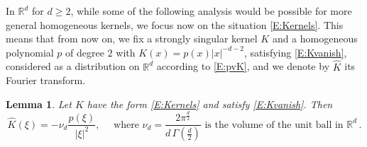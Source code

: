 \documentclass[12pt]{amsart}
\newtheorem{lemma}[theorem]{Lemma}
\theoremstyle{definition}
\theoremstyle{remark}
\numberwithin{equation}{section}
\newcommand\R{{\mathbb R}}
\let\hat=\widehat
\begin{document}
In $\R^{d}$ for $d\ge2$, while some of the following analysis would be possible for more general homogeneous kernels, we focus now on the situation \eqref{E:Kernels}. 
This means that from now on, we fix a strongly singular kernel $K$ and a homogeneous polynomial $p$ of degree $2$ with $K(x)=p(x)|x|^{-d-2}$, satisfying \eqref{E:Kvanish}, considered as a distribution on $\R^{d}$ according to \eqref{E:pvK}, and we denote by $\hat K$ its Fourier transform. 
\begin{lemma}
 \label{L:Khat} 
 Let $K$ have the form \eqref{E:Kernels} and satisfy \eqref{E:Kvanish}. Then
 \begin{equation}
\label{E:FKhat}
   \hat K(\xi) = -\nu_{d} \frac{p(\xi)}{|\xi|^{2}}, \quad\mbox{ where }
   \nu_{d} = \frac{2\pi^{\frac d2}}{d\,\Gamma(\frac d2)}
   \mbox{ is the volume of the unit ball in }\R^{d}\,.
\end{equation}
\end{lemma}
\end{document}
